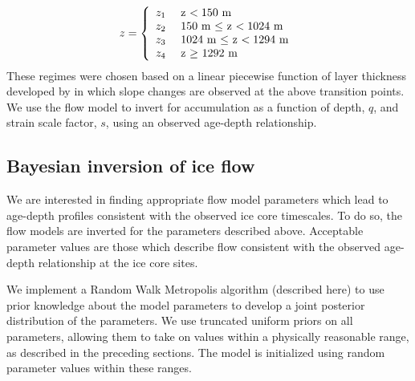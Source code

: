 \documentclass[12pt]{article}
\begin{document}
$$
z = \left\{ \begin{array}{rl}
z_1 & \mbox{  z $< 150$ m } \\
z_2 & \mbox{  150 m $\le$ z $< 1024$ m} \\
z_3 & \mbox{  1024 m $\le$ z $ < 1294$ m} \\
z_4 & \mbox{  z $\ge$ 1292 m }\end{array} \right.
\\
$$
These regimes were chosen based on a linear piecewise function of layer thickness developed by \citet{hammer1994} in which slope changes are observed at the above transition points. We use the flow model to invert for accumulation as a function of depth, $\textit{q}$, and strain scale factor, $\textit{s}$, \citep[][see]{morland2009} using an observed age-depth relationship. 




\subsection{Bayesian inversion of ice flow}\label{metrop}
We are interested in finding appropriate flow model parameters which lead to age-depth profiles consistent with the observed ice core timescales. To do so, the flow models are inverted for the parameters described above. Acceptable parameter values are those which describe flow consistent with the observed age-depth relationship at the ice core sites. 

We implement a Random Walk Metropolis algorithm (described here) to use prior knowledge about the model parameters to develop a joint posterior distribution of the parameters. We use truncated uniform priors on all parameters, allowing them to take on values within a physically reasonable range, as described in the preceding sections.  The model is initialized using random parameter values within these ranges.
\end{document}
